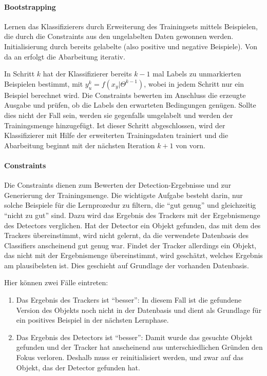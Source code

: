 	\paragraph{Bootstrapping}
	Lernen das Klassifizierers durch Erweiterung des Trainingsets mittels Beispielen, die durch die Constraints aus den ungelabelten Daten gewonnen werden. Initialisierung durch bereits gelabelte (also positive und negative Beispiele). Von da an erfolgt die Abarbeitung iterativ.

	In Schritt $k$ hat der Klassifizierer bereits $k-1$ mal Labels zu unmarkierten Beispielen bestimmt, mit $y_{u}^{k}=f(x_{y}|\Theta^{k-1})$, wobei in jedem Schritt nur ein Beispiel berechnet wird. Die Constraints bewerten im Anschluss die erzeugte Ausgabe und prüfen, ob die Labels den erwarteten Bedingungen genügen. Sollte dies nicht der Fall sein, werden sie gegenfalls umgelabelt und werden der Trainingsmenge hinzugefügt. Ist dieser Schritt abgeschlossen, wird der Klassifizierer mit Hilfe der erweiterten Trainingsdaten trainiert und die Abarbeitung beginnt mit der nächsten Iteration $k+1$ von vorn.

	\paragraph{Constraints}
	Die Constraints dienen zum Bewerten der Detection-Ergebnisse und zur Generierung der Trainingsmenge. Die wichtigste Aufgabe besteht darin, nur solche Beispiele für die Lernprozedur zu filtern, die ``gut genug'' und gleichzeitig ``nicht zu gut'' sind. Dazu wird das Ergebnis des Trackers mit der Ergebnismenge des Detectors verglichen. Hat der Detector ein Objekt gefunden, das mit dem des Trackers übereinstimmt, wird nicht gelernt, da die verwendete Datenbasis des Classifiers anscheinend gut genug war. Findet der Tracker allerdings ein Objekt, das nicht mit der Ergebnismenge übereinstimmt, wird geschätzt, welches Ergebnis am plausibelsten ist. Dies geschieht auf Grundlage der vorhanden Datenbasis.

	Hier können zwei Fälle eintreten:
	\begin{enumerate}
	\item Das Ergebnis des Trackers ist ``besser'': In diesem Fall ist die gefundene Version des Objekts noch nicht in der Datenbasis und dient als Grundlage für ein positives Beispiel in der nächsten Lernphase.
	\item Das Ergebnis des Detectors ist ``besser'': Damit wurde das gesuchte Objekt gefunden und der Tracker hat anscheinend aus unterschiedlichen Gründen den Fokus verloren. Deshalb muss er reinitialisiert werden, und zwar auf das Objekt, das der Detector gefunden hat.
	\end{enumerate}

